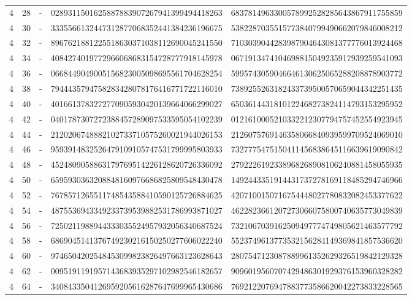 \begin{longtable}{rrrll}
4 & 28 & - & 0289311501625887883907267941399494418263 & 6837814963300578992528285643867911755859 \\
4 & 30 & - & 3335566132447312877068352441384236196675 & 5382287035515773840799490662079846008212 \\
4 & 32 & - & 8967621881225518630371038112690045241550 & 7103039044283987904643081377776013924468 \\
4 & 34 & - & 4084274019772966068683154728777918145978 & 0671913474104698815049235917939259541093 \\
4 & 36 & - & 0668449049005156823005098695561704628254 & 5995743059046646130625065288208878903772 \\
4 & 38 & - & 7944435794758283428078176416771722116010 & 7389255263182433739500570659044342251435 \\
4 & 40 & - & 4016613783272770905930420139664066299027 & 6503614431810122468273824114793153295952 \\
4 & 42 & - & 0401787307272388457289097533595054102239 & 0121610005210332212307794757452554923945 \\
4 & 44 & - & 2120206748882102733710575260021944026153 & 2126075769146358066840939599709524069010 \\
4 & 46 & - & 9593914832526479109105747531799995803933 & 7327775475150411456838645116639619090842 \\
4 & 48 & - & 4524809058863179769514226128620726336092 & 2792226192338968268908106240881458055935 \\
4 & 50 & - & 6595930363208848160976686825809548430478 & 1492443351914431737278169118485294746966 \\
4 & 52 & - & 7678571265511748543588410590125726884625 & 4207100150716754448027780832082453377622 \\
4 & 54 & - & 4875536943349233739539882531786993871027 & 4622823661207273066075800740635773049839 \\
4 & 56 & - & 7250211988944333035524957932056340687524 & 7321067039162509497774749805621463577792 \\
4 & 58 & - & 6869045141376749230216150250277606022240 & 5523749613773532156284149369841857536620 \\
4 & 60 & - & 9746504202548453099823826497663123628643 & 2807547123087889961352629326519842129328 \\
4 & 62 & - & 0095191191957143683935297102982546182657 & 9096019560707429486301929376153960328282 \\
4 & 64 & - & 3408433504126959205616287647699965430686 & 7692122076947883773586620042273833228565 \\

\end{longtable}
